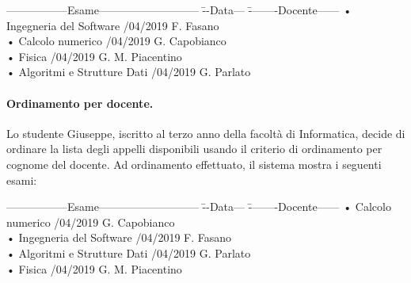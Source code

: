 \begin{tabbing}
	\hspace{1cm}-----------------Esame--------------------------- \= --Data--- \= --------Docente------ \kill
	\hspace{1cm} • Ingegneria del Software /04/2019   \> \hspace{1cm} F. Fasano \\
	\hspace{1cm} • Calcolo numerico /04/2019  \> \hspace{1cm} G. Capobianco \\
	\hspace{1cm} • Fisica /04/2019 \> \hspace{1cm} G. M. Piacentino  \\
	\hspace{1cm} • Algoritmi e Strutture Dati /04/2019 \> \hspace{1cm} G. Parlato \\
\end{tabbing} 

\paragraph{Ordinamento per docente.}
Lo studente Giuseppe, iscritto al terzo anno della facoltà di Informatica, decide di ordinare la lista degli appelli disponibili usando il criterio di ordinamento per cognome del docente. Ad ordinamento effettuato, il sistema mostra i seguenti esami:

\begin{tabbing}
	\hspace{1cm}-----------------Esame--------------------------- \= --Data--- \= --------Docente------ \kill
	\hspace{1cm} • Calcolo numerico /04/2019  \> \hspace{1cm} G. Capobianco \\
	\hspace{1cm} • Ingegneria del Software /04/2019   \> \hspace{1cm} F. Fasano \\
	\hspace{1cm} • Algoritmi e Strutture Dati /04/2019 \> \hspace{1cm} G. Parlato \\	
	\hspace{1cm} • Fisica /04/2019 \> \hspace{1cm} G. M. Piacentino  \\
\end{tabbing} 

